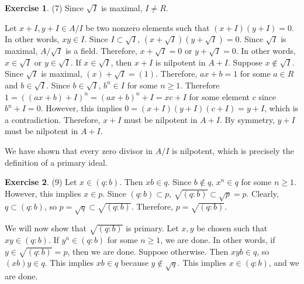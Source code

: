 \documentclass[12pt, psamsfonts]{amsart}
\theoremstyle{definition}
\newtheorem*{exer}{Exercise}
\theoremstyle{remark}
\numberwithin{equation}{section}
\begin{document}
\begin{exer}{(7)}
  Since $\sqrt{I}$ is maximal, $I \ne R$.

  Let $x + I, y + I \in A / I$ be two nonzero elements such that $(x + I)(y + I) = 0$.
  In other words, $xy \in I$.
  Since $I \subset \sqrt{I}$, $(x + \sqrt{I})(y + \sqrt{I}) = 0$.
  Since $\sqrt{I}$ is maximal, $A / \sqrt{I}$ is a field.
  Therefore, $x + \sqrt{I} = 0$ or $y + \sqrt{I} = 0$.
  In other words, $x \in \sqrt{I}$ or $y \in \sqrt{I}$.
  If $x \in \sqrt{I}$, then $x + I$ is nilpotent in $A + I$.
  Suppose $x \notin \sqrt{I}$.
  Since $\sqrt{I}$ is maximal, $(x) + \sqrt{I} = (1)$.
  Therefore, $ax + b = 1$ for some $a \in R$ and $b \in \sqrt{I}$.
  Since $b \in \sqrt{I}$, $b^n \in I$ for some $n \geq 1$.
  Therefore $1 = ((ax + b) + I)^n = (ax + b)^n + I = xc + I$ for some element $c$ since $b^n + I = 0$.
  However, this implies $0 = (x + I)(y + I)(c + I) = y + I$, which is a contradiction.
  Therefore, $x + I$ must be nilpotent in $A + I$.
  By symmetry, $y + I$ must be nilpotent in $A + I$.
  
  We have shown that every zero divisor in $A / I$ is nilpotent, which is precisely the definition of a primary ideal.
\end{exer}

\begin{exer}{(9)}
  Let $x \in (q:b)$.
  Then $xb \in q$.
  Since $b \notin q$, $x^n \in q$ for some $n \geq 1$.
  However, this implies $x \in p$.
  Since $(q:b) \subset p$, $\sqrt{(q:b)} \subset \sqrt{p} = p$.
  Clearly, $q \subset (q:b)$, so $p = \sqrt{q} \subset \sqrt{(q:b)}$.
  Therefore, $p = \sqrt{(q:b)}$.

  We will now show that $\sqrt{(q:b)}$ is primary.
  Let $x, y$ be chosen such that $xy \in (q:b)$.
  If $y^n \in (q:b)$ for some $n \geq 1$, we are done.
  In other words, if $y \in \sqrt{(q:b)} = p$, then we are done.
  Suppose otherwise.
  Then $xyb \in q$, so $(xb)y \in q$.
  This implies $xb \in q$ because $y \notin \sqrt{q}$.
  This implies $x \in (q:b)$, and we are done.
\end{exer}
\end{document}
